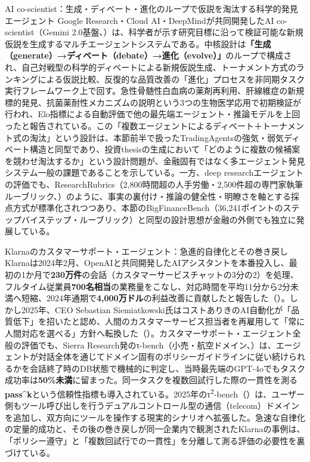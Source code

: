 \begin{casestudy}{AI co-scientist：生成・ディベート・進化のループで仮説を淘汰する科学的発見エージェント}
Google Research・Cloud AI・DeepMindが共同開発したAI co-scientist（Gemini 2.0基盤、\cite{y04aicoscientist2025}）は、科学者が示す研究目標に沿って検証可能な新規仮説を生成するマルチエージェントシステムである。中核設計は\textbf{「生成（generate）→ディベート（debate）→進化（evolve）」}のループで構成され、自己対戦型の科学的ディベートによる新規仮説生成、トーナメント方式のランキングによる仮説比較、反復的な品質改善の「進化」プロセスを非同期タスク実行フレームワーク上で回す。急性骨髄性白血病の薬剤再利用、肝線維症の新規標的発見、抗菌薬耐性メカニズムの説明という3つの生物医学応用で初期検証が行われ、Elo指標による自動評価で他の最先端エージェント・推論モデルを上回ったと報告されている。この「複数エージェントによるディベート＋トーナメント式の淘汰」という設計は、本節前半で扱ったTradingAgentsの強気・弱気ディベート構造と同型であり、投資thesisの生成において「どのように複数の候補案を競わせ淘汰するか」という設計問題が、金融固有ではなく多エージェント発見システム一般の課題であることを示している。一方、deep researchエージェントの評価でも、ResearchRubrics（2,800時間超の人手労働・2,500件超の専門家執筆ルーブリック、\cite{y04researchrubrics2025}）のように、事実の裏付け・推論の健全性・明瞭さを軸とする採点方式が標準化されつつあり、本節のBigFinanceBench（36,241ポイントのステップバイステップ・ルーブリック）と同型の設計思想が金融の外側でも独立に発展している。
\end{casestudy}

\begin{casestudy}{Klarnaのカスタマーサポート・エージェント：急進的自律化とその巻き戻し}
Klarnaは2024年2月、OpenAIと共同開発したAIアシスタントを本番投入し、最初の1か月で\textbf{230万件}の会話（カスタマーサービスチャットの3分の2）を処理、フルタイム従業員\textbf{700名相当}の業務量をこなし、対応時間を平均11分から2分未満へ短縮、2024年通期で\textbf{4,000万ドル}の利益改善に貢献したと報告した（\cite{y04klarnapress2024}）。しかし2025年、CEO Sebastian Siemiatkowski氏はコストありきのAI自動化が「品質低下」を招いたと認め、人間のカスタマーサービス担当者を再雇用して「常に人間対応を選べる」方針へ転換した（\cite{y04klarnawalkback2025}）。カスタマーサポート・エージェント全般の評価でも、Sierra Research発のτ-bench（小売・航空ドメイン、\cite{y04taubench2024}）は、エージェントが対話全体を通じてドメイン固有のポリシーガイドラインに従い続けられるかを会話終了時のDB状態で機械的に判定し、当時最先端のGPT-4oでもタスク成功率は\textbf{50\%未満}に留まった。同一タスクを複数回試行した際の一貫性を測る\textbf{pass\textasciicircum k}という信頼性指標も導入されている。2025年のτ\textsuperscript{2}-bench（\cite{y04tau2bench2025}）は、ユーザー側もツール呼び出しを行うデュアルコントロール型の通信（telecom）ドメインを追加し、双方向にツールを操作する現実的シナリオへ拡張した。急速な自律化の定量的成功と、その後の巻き戻しが同一企業内で観測されたKlarnaの事例は、「ポリシー遵守」と「複数回試行での一貫性」を分離して測る評価の必要性を裏づけている。
\end{casestudy}

